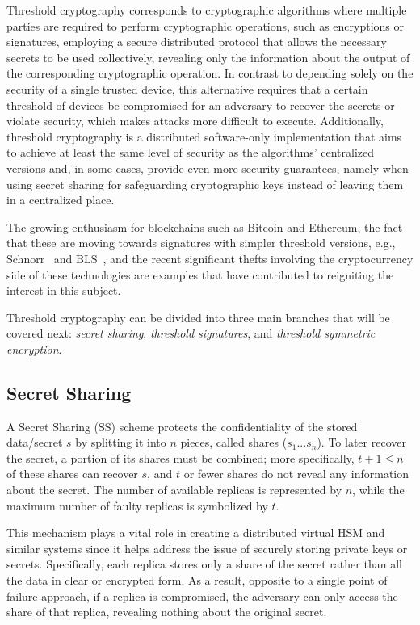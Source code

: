 Threshold cryptography corresponds to cryptographic algorithms where multiple parties are required to perform cryptographic operations, such as encryptions or signatures, employing a secure distributed protocol that allows the necessary secrets to be used collectively, revealing only the information about the output of the corresponding cryptographic operation. In contrast to depending solely on the security of a single trusted device, this alternative requires that a certain threshold of devices be compromised for an adversary to recover the secrets or violate security, which makes attacks more difficult to execute. Additionally, threshold cryptography is a distributed software-only implementation that aims to achieve at least the same level of security as the algorithms' centralized versions and, in some cases, provide even more security guarantees, namely when using secret sharing for safeguarding cryptographic keys instead of leaving them in a centralized place.

The growing enthusiasm for blockchains such as Bitcoin and Ethereum, the fact that these are moving towards signatures with simpler threshold versions, e.g., Schnorr~\cite{schnorrnotes} and BLS~\cite{blsdraft}, and the recent significant thefts involving the cryptocurrency side of these technologies \cite{cryptothefts2024} are examples that have contributed to reigniting the interest in this subject.  

Threshold cryptography can be divided into three main branches that will be covered next:\textit{ secret sharing}, \textit{threshold signatures}, and \textit{threshold symmetric encryption}.

\subsection{Secret Sharing} \label{subsec:secret-sharing}

A Secret Sharing (SS) scheme protects the confidentiality of the stored data/secret $s$ by splitting it into $n$ pieces, called shares ($s_1...s_n$). To later recover the secret, a portion of its shares must be combined; more specifically, $t + 1 \le n$ of these shares can recover $s$, and $t$ or fewer shares do not reveal any information about the secret. The number of available replicas is represented by $n$, while the maximum number of faulty replicas is symbolized by $t$.

This mechanism plays a vital role in creating a distributed virtual HSM and similar systems since it helps address the issue of securely storing private keys or secrets. Specifically, each replica stores only a share of the secret rather than all the data in clear or encrypted form. As a result, opposite to a single point of failure approach, if a replica is compromised, the adversary can only access the share of that replica, revealing nothing about the original secret.

